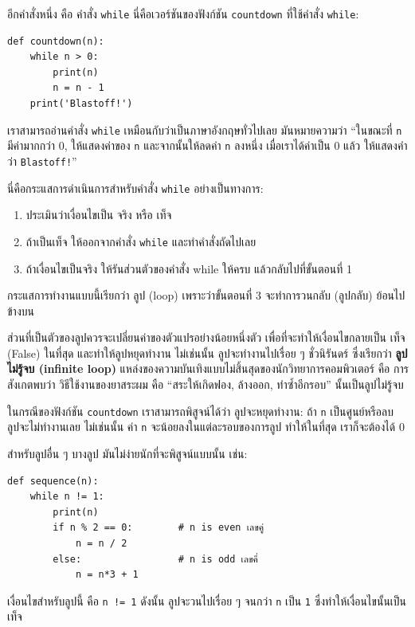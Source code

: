 อีกคำสั่งหนึ่ง คือ คำสั่ง {\tt while} นี่คือเวอร์ชันของฟังก์ชัน {\tt countdown} ที่ใช้คำสั่ง {\tt while}:

\begin{verbatim}
def countdown(n):
    while n > 0:
        print(n)
        n = n - 1
    print('Blastoff!')
\end{verbatim}
%
เราสามารถอ่านคำสั่ง {\tt while} เหมือนกับว่าเป็นภาษาอังกฤษทั่วไปเลย มันหมายความว่า
``ในขณะที่ {\tt n} มีค่ามากกว่า 0, ให้แสดงค่าของ {\tt n} และจากนั้นให้ลดค่า {\tt n} ลงหนึ่ง
เมื่อเราได้ค่าเป็น 0 แล้ว ให้แสดงคำว่า {\tt Blastoff!}''

นี่คือกระแสการดำเนินการสำหรับคำสั่ง {\tt while} อย่างเป็นทางการ:

\begin{enumerate}

\item ประเมินว่าเงื่อนไขเป็น จริง หรือ เท็จ

\item ถ้าเป็นเท็จ ให้ออกจากคำสั่ง {\tt while}
และทำคำสั่งถัดไปเลย

\item ถ้าเงื่อนไขเป็นจริง ให้รันส่วนตัวของคำสั่ง while ให้ครบ
แล้วกลับไปที่ขั้นตอนที่ 1

\end{enumerate}

กระแสการทำงานแบบนี้เรียกว่า ลูป (loop) เพราะว่าขั้นตอนที่ 3 จะทำการวนกลับ (ลูปกลับ) ย้อนไปข้างบน


ส่วนที่เป็นตัวของลูปควรจะเปลี่ยนค่าของตัวแปรอย่างน้อยหนึ่งตัว เพื่อที่จะทำให้เงื่อนไขกลายเป็น 
เท็จ (False) ในที่สุด และทำให้ลูปหยุดทำงาน  ไม่เช่นนั้น ลูปจะทำงานไปเรื่อย ๆ ชั่วนิรันดร์ ซึ่งเรียกว่า
{\bf ลูปไม่รู้จบ (infinite loop)}  แหล่งของความบันเทิงแบบไม่สิ้นสุดของนักวิทยาการคอมพิวเตอร์
คือ การสังเกตพบว่า วิธีใช้งานของยาสระผม คือ ``สระให้เกิดฟอง, ล้างออก, ทำซ้ำอีกรอบ'' นั้นเป็นลูปไม่รู้จบ

ในกรณีของฟังก์ชัน {\tt countdown} เราสามารถพิสูจน์ได้ว่า ลูปจะหยุดทำงาน: ถ้า {\tt n} เป็นศูนย์หรือลบ
ลูปจะไม่ทำงานเลย ไม่เช่นนั้น ค่า {\tt n} จะน้อยลงในแต่ละรอบของการลูป ทำให้ในที่สุด เราก็จะต้องได้ 0

สำหรับลูปอื่น ๆ บางลูป มันไม่ง่ายนักที่จะพิสูจน์แบบนั้น เช่น:

\begin{verbatim}
def sequence(n):
    while n != 1:
        print(n)
        if n % 2 == 0:        # n is even เลขคู่
            n = n / 2
        else:                 # n is odd เลขคี่
            n = n*3 + 1
\end{verbatim}
%
เงื่อนไขสำหรับลูปนี้ คือ {\tt n != 1} ดังนั้น ลูปจะวนไปเรื่อย ๆ จนกว่า {\tt n} เป็น {\tt 1}
ซึ่งทำให้เงื่อนไขนั้นเป็นเท็จ

